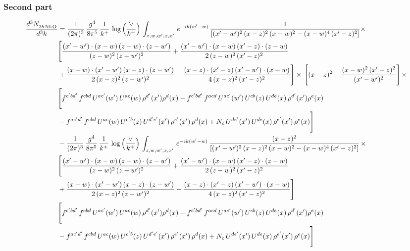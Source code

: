 \documentclass[9pt]{article}
\numberwithin{equation}{section}
\begin{document}
\subsubsection{Second part}
\begin{align}
    \frac{d^{3}N_{2b\,\rm NLO}^{\rm}}{d^{3}k}  & =  \frac{1}{(2\pi)^{3}}\, \frac{g^{4}}{8\pi^{5}}\,\frac{1}{k^{+}}\,\log{\left(\frac{\vee}{k^{+}}\right)}\,\int_{z,w,w^{\prime},x,x'}\, e^{-ik(w^{\prime}-w)}\, \frac{1}{\left[(x'-w')^{2}\,(x-z)^{2}\,(x-w)^{2} - (x-w)^{4}\, (x'-z)^{2}\right]} \times\notag \\ & \Bigg[\frac{(x'-w')\cdot (x-w)\, (z-w)\cdot (z-w')}{(z-w)^{2}\, (z-w')^{2}}+\frac{(x'-w')\cdot (x-w)\, (x'-z)\cdot (z-w)}{2\, (z-w)^{2}\, (x'-z)^{2}}\notag \\ & +\frac{(x-w)\cdot (x'-w')\, (x-z)\cdot (z-w')}{2\, (x-z)^{2}\, (z-w')^{2}}+\frac{(x-z)\cdot (x'-z)\, (x'-w')\cdot (x-w)}{4\, (x-z)^{2}\, (x'-z)^{2}}\Bigg] \times\,\Bigg[(x-z)^{2} - \frac{(x-w)^{2}\, (x'-z)^{2}}{(x'-w')^{2}}\Bigg]\,\times \notag \\ & \Bigg[f^{c'bd'}\,f^{cbd}\, U^{ac'}(w')\,U^{ac}(w)\,\rho^{d'}(x')\rho^{d}(x)- f^{c'bd'}\,f^{acd}\,U^{ac'}(w')\,U^{cb}(z)\,U^{de}(x)\,\rho^{d'}(x')\rho^{e}(x) \notag \\ & -f^{ac'd'}\,f^{cbd}\,U^{ac}(w)\,U^{c'b}(z)\,U^{d'e'}(x')\,\rho^{e'}(x')\,\rho^{d}(x) +N_{c}\,U^{de'}(x')\,U^{de}(x)\,\rho^{e'}(x')\,\rho^{e}(x)\Bigg] \notag \\
&  - \frac{1}{(2\pi)^{3}}\, \frac{g^{4}}{8\pi^{5}}\,\frac{1}{k^{+}}\,\log{\left(\frac{\vee}{k^{+}}\right)}\,\int_{z,w,w^{\prime},x,x'}\, e^{-ik(w^{\prime}-w)}\, \frac{(x-z)^{2}}{\left[(x'-w')^{2}\,(x-z)^{2}\,(x-w)^{2} - (x-w)^{4}\, (x'-z)^{2}\right]}\,  \times\notag \\ & \Bigg[\frac{(x'-w')\cdot (x-w)\, (z-w)\cdot (z-w')}{(z-w)^{2}\, (z-w')^{2}}+\frac{(x'-w')\cdot (x-w)\, (x'-z)\cdot (z-w)}{2\, (z-w)^{2}\, (x'-z)^{2}}\notag \\ & +\frac{(x-w)\cdot (x'-w')\, (x-z)\cdot (z-w')}{2\, (x-z)^{2}\, (z-w')^{2}}+\frac{(x-z)\cdot (x'-z)\, (x'-w')\cdot (x-w)}{4\, (x-z)^{2}\, (x'-z)^{2}}\Bigg] \notag \\ & \Bigg[f^{c'bd'}\,f^{cbd}\, U^{ac'}(w')\,U^{ac}(w)\,\rho^{d'}(x')\rho^{d}(x)- f^{c'bd'}\,f^{acd}\,U^{ac'}(w')\,U^{cb}(z)\,U^{de}(x)\,\rho^{d'}(x')\rho^{e}(x) \notag \\ & -f^{ac'd'}\,f^{cbd}\,U^{ac}(w)\,U^{c'b}(z)\,U^{d'e'}(x')\,\rho^{e'}(x')\,\rho^{d}(x) +N_{c}\,U^{de'}(x')\,U^{de}(x)\,\rho^{e'}(x')\,\rho^{e}(x)\Bigg] \notag \\

\end{align}
\end{document}
